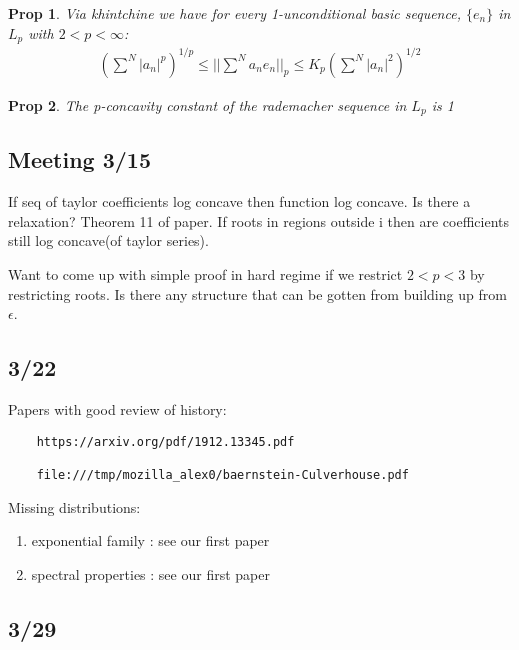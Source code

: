 \documentclass[11pt]{article}
\newtheorem{prop}{Prop}
\theoremstyle{remark}
\begin{document}
\begin{prop}
	Via khintchine we have for every 1-unconditional basic sequence, $\{e_n\}$ in $L_p$ with $2 < p < \infty$:
	\begin{align*}
		(\sum^N |a_n|^p)^{1/p} \leq || \sum^N a_n e_n||_p \leq K_p (\sum^N |a_n|^2)^{1/2}
	\end{align*}
\end{prop}

\begin{prop}
	The p-concavity constant of the rademacher sequence in $L_p$ is 1
\end{prop}

\subsection{Meeting 3/15}

\begin{remark}
	If seq of taylor coefficients log concave then function log concave. Is there a relaxation? Theorem 11 of paper. If roots in regions outside i then are coefficients still log concave(of taylor series). 
\end{remark}

\begin{remark}
	Want to come up with simple proof in hard regime if we restrict $2 < p < 3$ by restricting roots. Is there any structure that can be gotten from building up from $\epsilon$. 
\end{remark}

\subsection{3/22}

Papers with good review of history:

\begin{verbatim}
	https://arxiv.org/pdf/1912.13345.pdf

	file:///tmp/mozilla_alex0/baernstein-Culverhouse.pdf
\end{verbatim}

Missing distributions:
\begin{enumerate}
	\item exponential family : see our first paper
	\item spectral properties : see our first paper
\end{enumerate}

\subsection{3/29}
\end{document}
